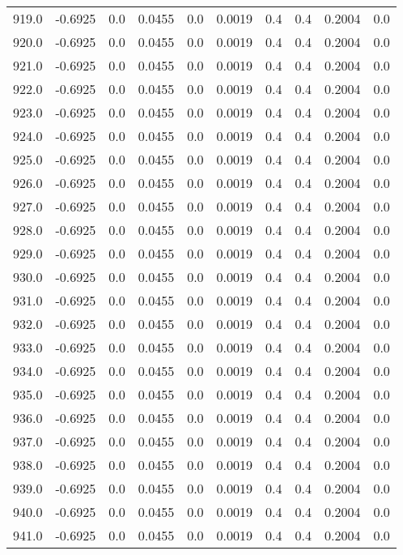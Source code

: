 \begin{longtable}{lrrrrrrrrr}
919.0 & -0.6925 & 0.0 & 0.0455 & 0.0 & 0.0019 & 0.4 & 0.4 & 0.2004 & 0.0 \\
920.0 & -0.6925 & 0.0 & 0.0455 & 0.0 & 0.0019 & 0.4 & 0.4 & 0.2004 & 0.0 \\
921.0 & -0.6925 & 0.0 & 0.0455 & 0.0 & 0.0019 & 0.4 & 0.4 & 0.2004 & 0.0 \\
922.0 & -0.6925 & 0.0 & 0.0455 & 0.0 & 0.0019 & 0.4 & 0.4 & 0.2004 & 0.0 \\
923.0 & -0.6925 & 0.0 & 0.0455 & 0.0 & 0.0019 & 0.4 & 0.4 & 0.2004 & 0.0 \\
924.0 & -0.6925 & 0.0 & 0.0455 & 0.0 & 0.0019 & 0.4 & 0.4 & 0.2004 & 0.0 \\
925.0 & -0.6925 & 0.0 & 0.0455 & 0.0 & 0.0019 & 0.4 & 0.4 & 0.2004 & 0.0 \\
926.0 & -0.6925 & 0.0 & 0.0455 & 0.0 & 0.0019 & 0.4 & 0.4 & 0.2004 & 0.0 \\
927.0 & -0.6925 & 0.0 & 0.0455 & 0.0 & 0.0019 & 0.4 & 0.4 & 0.2004 & 0.0 \\
928.0 & -0.6925 & 0.0 & 0.0455 & 0.0 & 0.0019 & 0.4 & 0.4 & 0.2004 & 0.0 \\
929.0 & -0.6925 & 0.0 & 0.0455 & 0.0 & 0.0019 & 0.4 & 0.4 & 0.2004 & 0.0 \\
930.0 & -0.6925 & 0.0 & 0.0455 & 0.0 & 0.0019 & 0.4 & 0.4 & 0.2004 & 0.0 \\
931.0 & -0.6925 & 0.0 & 0.0455 & 0.0 & 0.0019 & 0.4 & 0.4 & 0.2004 & 0.0 \\
932.0 & -0.6925 & 0.0 & 0.0455 & 0.0 & 0.0019 & 0.4 & 0.4 & 0.2004 & 0.0 \\
933.0 & -0.6925 & 0.0 & 0.0455 & 0.0 & 0.0019 & 0.4 & 0.4 & 0.2004 & 0.0 \\
934.0 & -0.6925 & 0.0 & 0.0455 & 0.0 & 0.0019 & 0.4 & 0.4 & 0.2004 & 0.0 \\
935.0 & -0.6925 & 0.0 & 0.0455 & 0.0 & 0.0019 & 0.4 & 0.4 & 0.2004 & 0.0 \\
936.0 & -0.6925 & 0.0 & 0.0455 & 0.0 & 0.0019 & 0.4 & 0.4 & 0.2004 & 0.0 \\
937.0 & -0.6925 & 0.0 & 0.0455 & 0.0 & 0.0019 & 0.4 & 0.4 & 0.2004 & 0.0 \\
938.0 & -0.6925 & 0.0 & 0.0455 & 0.0 & 0.0019 & 0.4 & 0.4 & 0.2004 & 0.0 \\
939.0 & -0.6925 & 0.0 & 0.0455 & 0.0 & 0.0019 & 0.4 & 0.4 & 0.2004 & 0.0 \\
940.0 & -0.6925 & 0.0 & 0.0455 & 0.0 & 0.0019 & 0.4 & 0.4 & 0.2004 & 0.0 \\
941.0 & -0.6925 & 0.0 & 0.0455 & 0.0 & 0.0019 & 0.4 & 0.4 & 0.2004 & 0.0 \\

\end{longtable}
